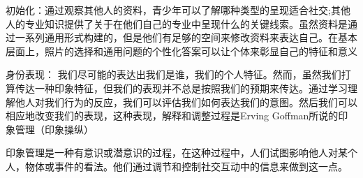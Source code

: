 初始化：通过观察其他人的资料，青少年可以了解哪种类型的呈现适合社交;其他人的专业知识提供了关于在他们自己的专业中呈现什么的关键线索。虽然资料是通过一系列通用形式构建的，但是他们有足够的空间来修改资料来表达自己。在基本层面上，照片的选择和通用问题的个性化答案可以让个体来彰显自己的特征和意义

身份表现：
我们尽可能的表达出我们是谁，我们的个人特征。然而，虽然我们打算传达一种印象特征，但我们的表现并不总是按照我们的预期来传达。通过学习理解他人对我们行为的反应，我们可以评估我们如何表达我们的意图。然后我们可以相应地改变我们的表现，这种表现，解释和调整过程是Erving Goffman所说的印象管理（印象操纵）

印象管理是一种有意识或潜意识的过程，在这种过程中，人们试图影响他人对某个人，物体或事件的看法。他们通过调节和控制社交互动中的信息来做到这一点。







